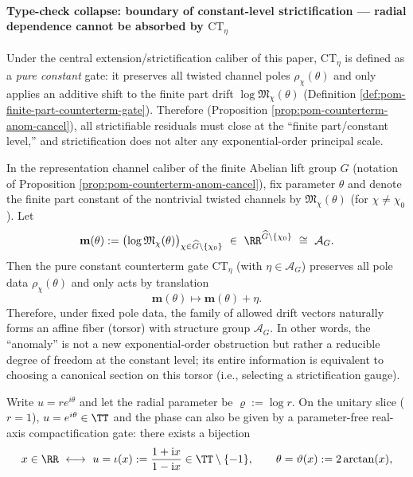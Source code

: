\paragraph{Type-check collapse: boundary of constant-level strictification --- radial dependence cannot be absorbed by \texorpdfstring{$\mathrm{CT}_\eta$}{CT}}
Under the central extension/strictification caliber of this paper, \(\mathrm{CT}_\eta\) is defined as a \emph{pure constant} gate: it preserves all twisted channel poles \(\rho_\chi(\theta)\) and only applies an additive shift to the finite part drift \(\log\mathfrak{M}_\chi(\theta)\) (Definition \ref{def:pom-finite-part-counterterm-gate}).
Therefore (Proposition \ref{prop:pom-counterterm-anom-cancel}), all strictifiable residuals must close at the ``finite part/constant level,'' and strictification does not alter any exponential-order principal scale.
\begin{remark}\label{rem:xi-finite-part-drift-torsor}
In the representation channel caliber of the finite Abelian lift group \(G\) (notation of Proposition \ref{prop:pom-counterterm-anom-cancel}), fix parameter \(\theta\) and denote the finite part constant of the nontrivial twisted channels by \(\mathfrak{M}_\chi(\theta)\) (for \(\chi\neq\chi_0\)).
Let
\[
\mathbf{m}(\theta):=\bigl(\log\mathfrak{M}_\chi(\theta)\bigr)_{\chi\in\widehat G\setminus\{\chi_0\}}
\ \in\ \RR^{\widehat G\setminus\{\chi_0\}}\ \cong\ \mathcal{A}_G.
\]
Then the pure constant counterterm gate \(\mathrm{CT}_\eta\) (with \(\eta\in\mathcal{A}_G\)) preserves all pole data \(\rho_\chi(\theta)\) and only acts by translation
\[
\mathbf{m}(\theta)\longmapsto \mathbf{m}(\theta)+\eta.
\]
Therefore, under fixed pole data, the family of allowed drift vectors naturally forms an affine fiber (torsor) with structure group \(\mathcal{A}_G\).
In other words, the ``anomaly'' is not a new exponential-order obstruction but rather a reducible degree of freedom at the constant level; its entire information is equivalent to choosing a canonical section on this torsor (i.e., selecting a strictification gauge).
\end{remark}
\par
Write \(u=re^{i\theta}\) and let the radial parameter be \(\varrho:=\log r\).
On the unitary slice (\(r=1\)), \(u=e^{i\theta}\in\TT\) and the phase can also be given by a parameter-free real-axis compactification gate: there exists a bijection
\[
x\in\RR\ \longleftrightarrow\ u=\iota(x):=\frac{1+\mathrm{i}x}{1-\mathrm{i}x}\in\TT\setminus\{-1\},
\qquad
\theta=\vartheta(x):=2\arctan(x),
\]
